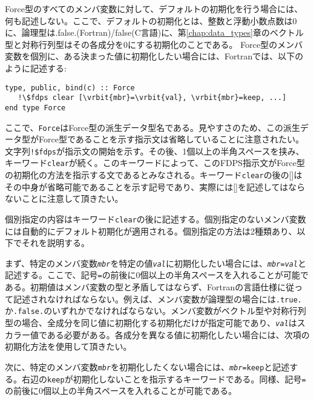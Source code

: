 \begin{enumerate}[leftmargin=*,label=(\arabic*)]
 Force型のすべてのメンバ変数に対して、デフォルトの初期化を行う場合には、何も記述しない。ここで、デフォルトの初期化とは、整数と浮動小数点数は0に、論理型は.false.(Fortran)/false(C言語)に、第\ref{chap:data_types}章のベクトル型と対称行列型はその各成分を0にする初期化のことである。
Force型のメンバ変数を個別に、ある決まった値に初期化したい場合には、Fortranでは、以下のように記述する:
\begin{screen}
\begin{Verbatim}[commandchars=\\\{\}]
type, public, bind(c) :: Force
   !\$fdps clear [\vrbit{mbr}=\vrbit{val}, \vrbit{mbr}=keep, ...] 
end type Force
\end{Verbatim}
\end{screen}
ここで、\texttt{Force}はForce型の派生データ型名である。見やすさのため、この派生データ型がForce型であることを示す指示文は省略していることに注意されたい。文字列\texttt{!\$fdps}が指示文の開始を示す。その後、1個以上の半角スペースを挟み、キーワード\texttt{clear}が続く。このキーワードによって、このFDPS指示文がForce型の初期化の方法を指示する文であるとみなされる。キーワード\texttt{clear}の後の[]はその中身が省略可能であることを示す記号であり、実際には[]を記述してはならないことに注意して頂きたい。

個別指定の内容はキーワード\texttt{clear}の後に記述する。個別指定のないメンバ変数には自動的にデフォルト初期化が適用される。個別指定の方法は2種類あり、以下でそれを説明する。

まず、特定のメンバ変数\textit{\texttt{mbr}}を特定の値\textit{\texttt{val}}に初期化したい場合には、\texttt{\textit{mbr}=\textit{val}}と記述する。ここで、記号\texttt{=}の前後に0個以上の半角スペースを入れることが可能である。初期値はメンバ変数の型と矛盾してはならず、Fortranの言語仕様に従って記述されなければならない。例えば、メンバ変数が論理型の場合には\texttt{.true.}か\texttt{.false.}のいずれかでなければならない。メンバ変数がベクトル型や対称行列型の場合、全成分を同じ値に初期化する初期化だけが指定可能であり、\textit{\texttt{val}}はスカラー値である必要がある。各成分を異なる値に初期化したい場合には、次項の初期化方法を使用して頂きたい。

次に、特定のメンバ変数\textit{\texttt{mbr}}を初期化したくない場合には、\texttt{\textit{mbr}=keep}と記述する。右辺の\texttt{keep}が初期化しないことを指示するキーワードである。同様、記号\texttt{=}の前後に0個以上の半角スペースを入れることが可能である。


\end{enumerate}
